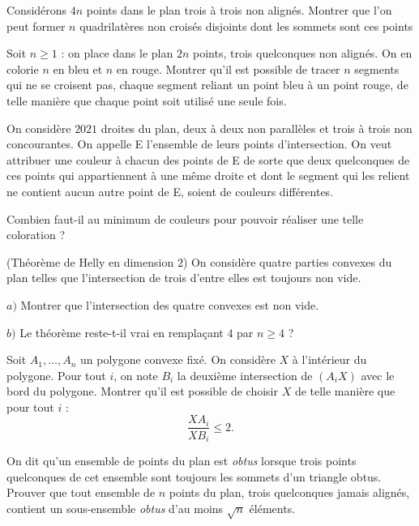 \begin{exo}
Considérons $4n$ points dans le plan trois à trois non alignés. Montrer que l'on peut former $n$ quadrilatères non croisés disjoints dont les sommets sont ces points
\end{exo}


\begin{exo}
Soit $n\ge 1$ : on place dans le plan $2n$ points, trois quelconques non alignés. On en colorie $n$ en bleu et $n$ en rouge. Montrer qu’il est possible de tracer $n$ segments qui ne se croisent pas, chaque segment reliant un point bleu à un point rouge, de telle manière que chaque point soit utilisé une seule fois.
\end{exo}


\begin{exo}
On considère $2021$ droites du plan, deux à deux non parallèles et trois à trois non concourantes. On appelle E l’ensemble de leurs points d’intersection. On veut attribuer une couleur à chacun des points de E de sorte que deux quelconques de ces points qui appartiennent à une même droite et dont le segment qui les relient ne contient aucun autre point de E, soient de couleurs différentes.

Combien faut-il au minimum de couleurs pour pouvoir réaliser une telle coloration ?
\end{exo}


\begin{exo}
(Théorème de Helly en dimension $2$) On considère quatre parties convexes du plan telles que l’intersection de trois d’entre elles est toujours non vide.

$a)$ Montrer que l’intersection des quatre convexes est non vide.

$b)$ Le théorème reste-t-il vrai en remplaçant $4$ par $n \ge 4$ ?
\end{exo}


\begin{exo}
Soit $A_1,\ldots,A_n$ un polygone convexe fixé. On considère $X$ à l’intérieur du polygone. Pour tout $i$, on note $B_i$ la deuxième intersection de $(A_iX)$ avec le bord du polygone. Montrer qu’il est possible de choisir $X$ de telle manière que pour tout $i$ :
$$\frac{XA_i}{XB_i}\le 2.$$
\end{exo}


\begin{exo}
On dit qu’un ensemble de points du plan est \textit{obtus} lorsque trois points quelconques de cet ensemble sont toujours les sommets d’un triangle obtus. Prouver que tout ensemble de $n$ points du plan, trois quelconques jamais alignés, contient un sous-ensemble \textit{obtus} d’au moins $\sqrt n$ éléments.
\end{exo}


